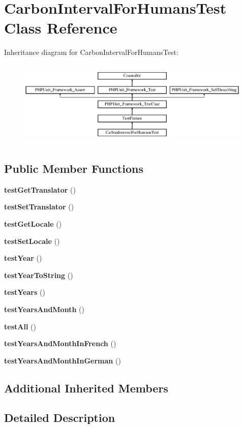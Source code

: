 \section{Carbon\+Interval\+For\+Humans\+Test Class Reference}
\label{class_carbon_interval_for_humans_test}
Inheritance diagram for Carbon\+Interval\+For\+Humans\+Test\+:\begin{figure}[H]
\begin{center}
\leavevmode
\includegraphics[height=4.129793cm]{class_carbon_interval_for_humans_test}
\end{center}
\end{figure}
\subsection*{Public Member Functions}
\begin{DoxyCompactItemize}
\item 
{\bf test\+Get\+Translator} ()
\item 
{\bf test\+Set\+Translator} ()
\item 
{\bf test\+Get\+Locale} ()
\item 
{\bf test\+Set\+Locale} ()
\item 
{\bf test\+Year} ()
\item 
{\bf test\+Year\+To\+String} ()
\item 
{\bf test\+Years} ()
\item 
{\bf test\+Years\+And\+Month} ()
\item 
{\bf test\+All} ()
\item 
{\bf test\+Years\+And\+Month\+In\+French} ()
\item 
{\bf test\+Years\+And\+Month\+In\+German} ()
\end{DoxyCompactItemize}
\subsection*{Additional Inherited Members}


\subsection{Detailed Description}


